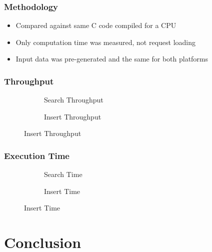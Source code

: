 \documentclass{beamer}
\begin{document}
\begin{frame}
	\frametitle{Methodology}
	\begin{itemize}
		\item Compared against same C code compiled for a CPU
		\item Only computation time was measured, not request loading
		\item Input data was pre-generated and the same for both platforms
	\end{itemize}
\end{frame}


\begin{frame}
	\frametitle{Throughput}
	\begin{figure}
		\begin{subfigure}{0.49\textwidth}
			\resizebox{\textwidth}{!}{
				
			}
			\caption{Search Throughput}
		\end{subfigure}
		\begin{subfigure}{0.49\textwidth}
			\resizebox{\textwidth}{!}{
				
			}
			\caption{Insert Throughput}
		\end{subfigure}
	\end{figure}
\end{frame}


\begin{frame}
	\frametitle{Execution Time}
	\begin{figure}
		\begin{subfigure}{0.49\textwidth}
			\resizebox{\textwidth}{!}{
				
			}
			\caption{Search Time}
		\end{subfigure}
		\begin{subfigure}{0.49\textwidth}
			\resizebox{\textwidth}{!}{
				
			}
			\caption{Insert Time}
		\end{subfigure}
	\end{figure}
\end{frame}


\section{Conclusion}
\end{document}
